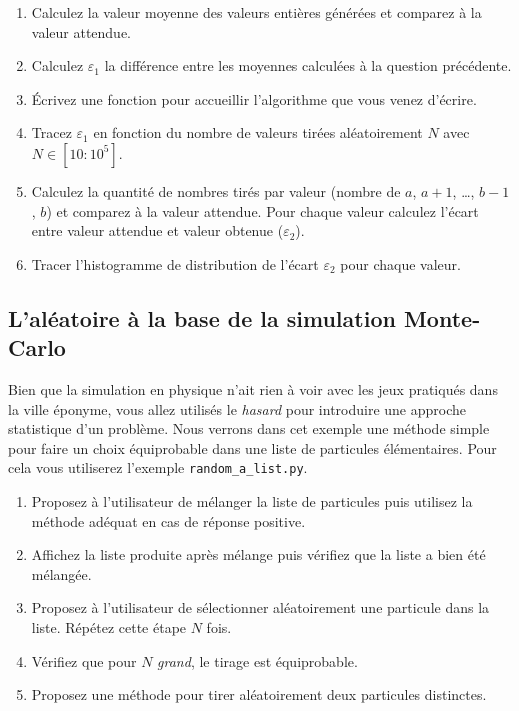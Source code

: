 \begin{enumerate}
\item  Calculez la  valeur moyenne  des valeurs  entières générées  et
  comparez à la valeur attendue.

\item  Calculez  $\varepsilon_1$  la  différence  entre  les  moyennes
  calculées à la question précédente.

\item Écrivez une fonction pour accueillir l'algorithme que vous venez
  d'écrire.

  
\item Tracez $\varepsilon_1$  en fonction du nombre  de valeurs tirées
  aléatoirement $N$ avec $N \in [10:10^5]$.
  
\item Calculez la quantité de nombres tirés par valeur (nombre de $a$,
  $a+1$, \dots,  $b-1$, $b$)  et comparez à  la valeur  attendue. Pour
  chaque  valeur  calculez l'écart  entre  valeur  attendue et  valeur
  obtenue ($\varepsilon_2$).

\item Tracer l'histogramme de  distribution de l'écart $\varepsilon_2$
  pour chaque valeur.

\end{enumerate}


\subsection{L'aléatoire à la base de la simulation Monte-Carlo}

Bien que  la simulation en  physique n'ait rien  à voir avec  les jeux
pratiqués   dans   la   ville   éponyme,  vous   allez   utilisés   le
\textit{hasard}   pour  introduire   une  approche   statistique  d'un
problème.  Nous verrons dans cet exemple une méthode simple pour faire
un choix équiprobable dans une liste de particules élémentaires.  Pour
cela vous utiliserez l'exemple \texttt{random\_a\_list.py}.

\begin{enumerate}
\item Proposez à l'utilisateur de mélanger la liste de particules puis
  utilisez la méthode adéquat en cas de réponse positive.  %
\item Affichez  la liste produite  après mélange puis vérifiez  que la
  liste a bien été mélangée.  %
\item  Proposez  à  l'utilisateur de  sélectionner  aléatoirement  une
  particule dans la liste. Répétez cette étape $N$ fois.  %
\item   Vérifiez  que   pour   $N$  \textit{grand},   le  tirage   est
  équiprobable.  %
\item Proposez  une méthode pour tirer  aléatoirement deux particules
  distinctes.  %
\end{enumerate}


